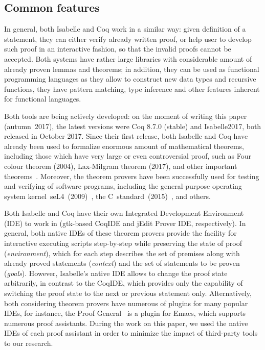 \documentclass[article]{aaltoseries}
\begin{document}



\subsection{Common features}

In general, both Isabelle and Coq work in a similar way: given definition of a statement, they can either verify already written proof, or help user to develop such proof in an interactive fashion, so that the invalid proofs cannot be accepted. Both systems have rather large libraries with considerable amount of already proven lemmas and theorems; in addition, they can be used as functional programming languages as they allow to construct new data types and recursive functions, they have pattern matching, type inference and other features inherent for functional languages.

Both tools are being actively developed: on the moment of writing this paper (autumn~2017), the latest versions were Coq 8.7.0 (stable) and Isabelle2017, both released in October 2017. Since their first release, both Isabelle and Coq have already been used to formalize enormous amount of mathematical theorems, including those which have very large or even controversial proof, such as Four colour theorem (2004), Lax-Milgram theorem (2017), and other important theorems~\cite{Wiedijk100}. Moreover, the theorem provers have been successfully used for testing and verifying of software programs, including the general-purpose operating system kernel~seL4~(2009)~\cite{Klein09}, the C~standard~(2015)~\cite{Krebbers15}, and others.

Both Isabelle and Coq have their own Integrated Development Environment (IDE) to work in (gtk-based CoqIDE and jEdit Prover IDE, respectively). In general, both native IDEs of these theorem provers provide the facility for interactive executing scripts step-by-step while preserving the state of proof (\textit{environment}), which for each step describes the set of premises along with already proved statements (\textit{context}) and the set of statements to be proven (\textit{goals}). However, Isabelle's native IDE allows to change the proof state arbitrarily, in contrast to the CoqIDE, which provides only the capability of switching the proof state to the next or previous statement only. Alternatively, both considering theorem provers have numerous of plugins for many popular IDEs, for instance, the Proof General~\cite{tool_PG} is a plugin for Emacs, which supports numerous proof assistants. During the work on this paper, we used the native IDEs of each proof assistant in order to minimize the impact of third-party tools to our research.
\end{document}
